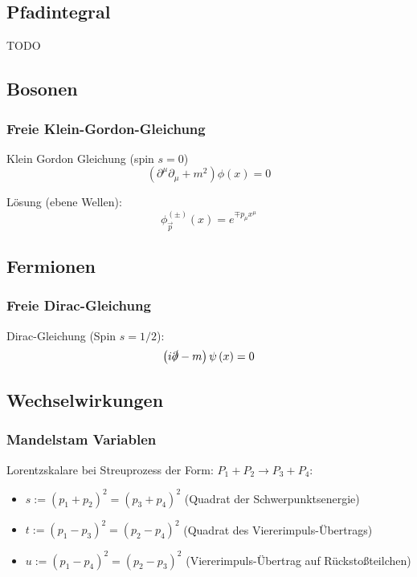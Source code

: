 \documentclass[11pt]{article}
\numberwithin{equation}{section}
\begin{document}
		\subsection{Pfadintegral}
			TODO

		\subsection{Bosonen}
			\subsubsection{Freie Klein-Gordon-Gleichung}
				\noindent
				Klein Gordon Gleichung (spin $s=0$)
				\begin{equation}
					\left(\partial^\mu\partial_\mu+m^2\right) \phi(x) = 0
				\end{equation}

				\noindent
				Lösung (ebene Wellen):
				\begin{equation}
					{\phi}^{ ( \pm ) }_{\vec{p}} (x) = e^{\mp p_\mu x^\mu}
				\end{equation}

		\subsection{Fermionen}
			\subsubsection{Freie Dirac-Gleichung}
				\noindent
				Dirac-Gleichung (Spin $s=1/2$):
				\begin{equation}
					\left(  i\slashed{\partial} - m  \right) \psi\left( x \right) = 0
				\end{equation}





		\subsection{Wechselwirkungen}
			\subsubsection{Mandelstam Variablen}
				\noindent
				Lorentzskalare bei Streuprozess der Form: $P_1 + P_2 \rightarrow P_3 + P_4$:
				\begin{itemize}\itemsep -0pt	%
					\item $s:=(p_1+p_2)^2=(p_3+p_4)^2$ \hfill{(Quadrat der Schwerpunktsenergie)}
					\item $t:=(p_1-p_3)^2=(p_2-p_4)^2$ \hfill{(Quadrat des Viererimpuls-Übertrags)}
					\item $u:=(p_1-p_4)^2=(p_2-p_3)^2$ \hfill{(Viererimpuls-Übertrag auf Rückstoßteilchen)}
				\end{itemize}
\end{document}
